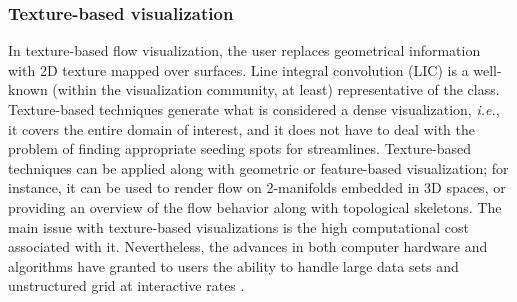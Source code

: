 \subsubsection{Texture-based visualization} 
%
In texture-based flow visualization, the user replaces geometrical information with 2D texture mapped over surfaces. 
%
Line integral convolution (LIC) is a well-known (within the visualization community, at least) representative of the class. 
%
Texture-based techniques generate what is considered a dense visualization, \emph{i.e.}, it covers the entire domain of interest,
%
%
and it does not have to deal with the problem of finding appropriate seeding spots for streamlines. 
%
Texture-based techniques can be applied along with geometric or feature-based visualization; for instance, it can be used to render flow on 2-manifolds embedded in 3D spaces, or providing an overview of the flow behavior along with topological skeletons.
%
The main issue with texture-based visualizations is the high computational cost associated with it. 
%
Nevertheless, the advances in both computer hardware and algorithms have granted to users the ability to handle large data sets and unstructured grid at interactive rates \cite{Edmunds2012974, laramee2008applications}.

